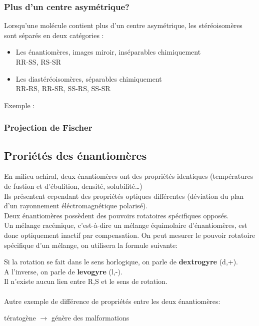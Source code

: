\documentclass{article}
\newcommand{\insertslide}[2]{
\begin{center}
    \fbox{\texttt{[image: \#1]}}
\end{center}
}
\begin{document}
        \subsubsection{Plus d'un centre asymétrique?}
            Lorsqu'une molécule contient plus d'un centre asymétrique, les 
            stéréoisomères sont séparés en deux catégories :
            \begin{itemize}
                \item Les énantiomères, images miroir, inséparables chimiquement\\
                RR-SS, RS-SR 
                \item Les diastéréoisomères, séparables chimiquement\\
                RR-RS, RR-SR, SS-RS, SS-SR
            \end{itemize}
            Exemple :
            \insertslide{Slides/CM2.pdf}{27}
            \insertslide{Slides/CM2.pdf}{28}
        
        \subsubsection{Projection de Fischer}
            \insertslide{Slides/CM2.pdf}{35}
\pagebreak
    \subsection{Proriétés des énantiomères}
        En milieu achiral, deux énantiomères ont des propriétés
        identiques (températures de fustion et d'ébulition,
        densité, solubilité…)\\
        Ils présentent cependant des propriétés optiques
        différentes (déviation du plan d’un rayonnement
        éléctromagnétique polarisé).\\
        Deux énantiomères possèdent des pouvoirs rotatoires
        spécifiques opposés.\\
        Un mélange racémique, c’est-à-dire un mélange
        équimolaire d’énantiomères, est donc optiquement
        inactif par compensation.
        On peut mesurer le pouvoir rotatoire spécifique d'un mélange,
        on utilisera la formule suivante:
        \insertslide{Slides/CM2.pdf}{38}
        Si la rotation se fait dans le sens horlogique, on parle de \textbf{dextrogyre} (d,+).\\
        A l'inverse, on parle de \textbf{levogyre} (l,-).\\
        Il n'existe aucun lien entre R,S et le sens de rotation.\\\\
        Autre exemple de différence de propriétés entre les deux énantiomères:
        \insertslide{Slides/CM2.pdf}{41}
        tératogène $\rightarrow$ génère des malformations
\end{document}

